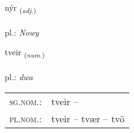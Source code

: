 \documentclass[frontgrid, backgrid]{flacards}\usepackage[]{graphicx}\usepackage[]{xcolor}
\begin{document}
{nýr \small{\textsubscript{(\textit{adj.})}} \\[1ex] %
\textphonetic{[niːr]} \\
pl.: \emph{Nowy} \\  [2ex]
\renewcommand*{\arraystretch}{0.8}
}

\renewcommand{\flhead}{\vskip5pt \fboxsep=0pt {\small\bfseries\footnotesize Töluorð | liczebnik}}
\renewcommand{\fcfoot}{\vskip5pt \fboxsep=0pt \hspace{2pt}{\small\bfseries\footnotesize 1K}}

\renewcommand{\blhead}{\vskip5pt {\small\bfseries\footnotesize Töluorð | liczebnik }}
\renewcommand{\bcfoot}{\vskip5pt \hspace{2pt}{\small\bfseries\footnotesize 1K}}


{tveir \small{\textsubscript{(\textit{num.})}} \\[1ex] %
\textphonetic{[tʰveiːr]} \\
pl.: \emph{dwa} \\  [2ex]
\renewcommand*{\arraystretch}{0.8}
\begin{tabular}{ll}
\textsc{sg.nom.}: & tveir  -- \\ 
\textsc{pl.nom.}: & tveir -- tvær -- tvö
\end{tabular}
}

\renewcommand{\flhead}{\vskip5pt \fboxsep=0pt {\small\bfseries\footnotesize Sagnorð | czasownik}}
\renewcommand{\fcfoot}{\vskip5pt \fboxsep=0pt \hspace{2pt}{\small\bfseries\footnotesize 1K}}

\renewcommand{\blhead}{\vskip5pt {\small\bfseries\footnotesize Sagnorð | czasownik }}
\renewcommand{\bcfoot}{\vskip5pt \hspace{2pt}{\small\bfseries\footnotesize 1K}}
\end{document}
